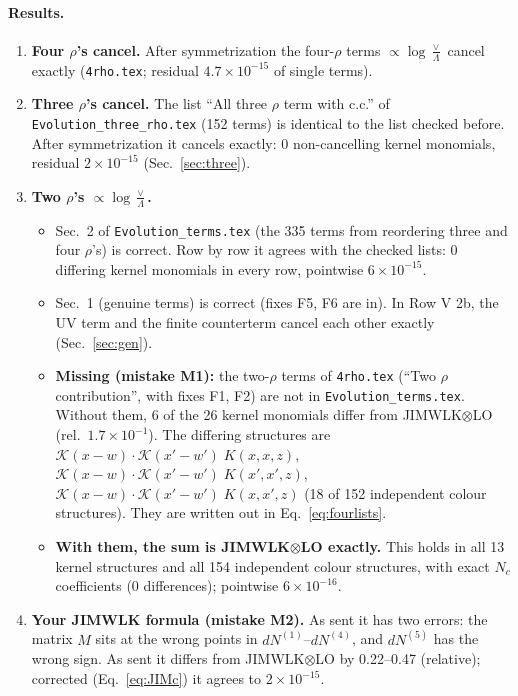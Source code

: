 \documentclass[10pt]{article}
\numberwithin{equation}{section}
\begin{document}
\paragraph{Results.}
\begin{enumerate}
\item \textbf{Four $\rho$'s cancel.} After symmetrization the four-$\rho$ terms $\propto\log\frac{\vee}{\Lambda}$ cancel exactly (\texttt{4rho.tex}; residual $4.7\times10^{-15}$ of single terms).
\item \textbf{Three $\rho$'s cancel.} The list ``All three $\rho$ term with c.c.'' of \texttt{Evolution\_three\_rho.tex} (152 terms) is identical to the list checked before. After symmetrization it cancels exactly: 0 non-cancelling kernel monomials, residual $2\times10^{-15}$ (Sec.~\ref{sec:three}).
\item \textbf{Two $\rho$'s $\propto\log\frac{\vee}{\Lambda}$.}
\begin{itemize}
\item Sec.~2 of \texttt{Evolution\_terms.tex} (the 335 terms from reordering three and four $\rho$'s) is correct. Row by row it agrees with the checked lists: 0 differing kernel monomials in every row, pointwise $6\times10^{-15}$.
\item Sec.~1 (genuine terms) is correct (fixes F5, F6 are in). In Row V 2b, the UV term and the finite counterterm cancel each other exactly (Sec.~\ref{sec:gen}).
\item \textbf{Missing (mistake M1):} the two-$\rho$ terms of \texttt{4rho.tex} (``Two $\rho$ contribution'', with fixes F1, F2) are not in \texttt{Evolution\_terms.tex}. Without them, 6 of the 26 kernel monomials differ from JIMWLK$\otimes$LO (rel.\ $1.7\times10^{-1}$). The differing structures are $\mathcal K(x-w)\cdot\mathcal K(x'-w')\;K(x,x,z)$, $\mathcal K(x-w)\cdot\mathcal K(x'-w')\;K(x',x',z)$, $\mathcal K(x-w)\cdot\mathcal K(x'-w')\;K(x,x',z)$ (18 of 152 independent colour structures). They are written out in Eq.~\eqref{eq:fourlists}.
\item \textbf{With them, the sum is JIMWLK$\otimes$LO exactly.} This holds in all 13 kernel structures and all 154 independent colour structures, with exact $N_c$ coefficients (0 differences); pointwise $6\times10^{-16}$.
\end{itemize}
\item \textbf{Your JIMWLK formula (mistake M2).} As sent it has two errors: the matrix $M$ sits at the wrong points in $dN^{(1)}$--$dN^{(4)}$, and $dN^{(5)}$ has the wrong sign. As sent it differs from JIMWLK$\otimes$LO by 0.22--0.47 (relative); corrected (Eq.~\eqref{eq:JIMc}) it agrees to $2\times10^{-15}$.

\end{enumerate}
\end{document}
